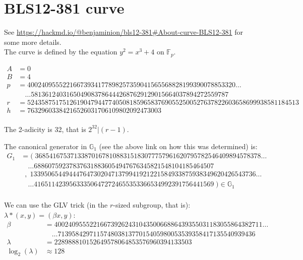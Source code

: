 \documentclass[12pt,draft,a4paper,openany,oneside]{amsbook}
\def\F{\mathbb{F}}
\def\G{\mathbb{G}}
\theoremstyle{plain}
\theoremstyle{definition}
\begin{document}
\section{BLS12-381 curve}

See \url{https://hackmd.io/@benjaminion/bls12-381#About-curve-BLS12-381} for 
some more details.\\

The curve is defined by the equation $y^2 = x^3 + 4$ on $\F_p$.

\begin{align*}
A &= 0 \\
B &= 4 \\
p &= 40024095552216673934177898257359041565568828199390078853320 \dots \\
  &\quad   \dots 58136124031650490837864442687629129015664037894272559787 \\ 
r &= 52435875175126190479447740508185965837690552500527637822603658699938581184513 \\
h &= 76329603384216526031706109802092473003 \\
\end{align*}

The 2-adicity is 32, that is $2^{32} | (r-1)$. 

The canonical generator in $\G_1$ (see the above link on how this was determined) is:
\begin{align*}
G_1 &= (\;3685416753713387016781088315183077757961620795782546409894578378\dots \\
    &   \quad\dots 688607592378376318836054947676345821548104185464507  \\ 
    &\;\;  ,\;1339506544944476473020471379941921221584933875938349620426543736\dots \\
    &   \quad\dots 416511423956333506472724655353366534992391756441569\;) \in \G_1\\
\end{align*}

We can use the GLV trick (in the $r$-sized subgroup, that is): $\lambda*(x,y)=(\beta x,y)$:
\begin{align*}
\beta &= 40024095552216673926243104350066886439355031183055864382711 \dots \\
      &\quad \dots 71395842971157480381377015405980053539358417135540939436\\
\lambda &= 228988810152649578064853576960394133503 \\
\log_2(\lambda) &\approx 128 \\
\end{align*}


\end{document}
